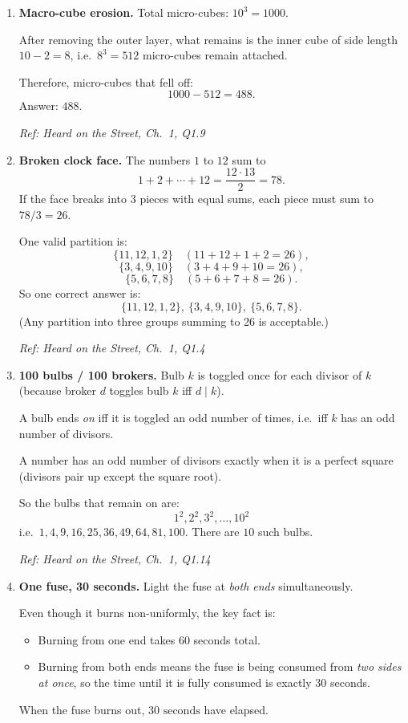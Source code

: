 \documentclass[11pt]{article}
\begin{document}
\begin{enumerate}[label=\textbf{\arabic*.}]

\item \textbf{Macro-cube erosion.}
Total micro-cubes: \(10^3=1000\).

After removing the outer layer, what remains is the inner cube of side length \(10-2=8\), i.e.\ \(8^3=512\) micro-cubes remain attached.

Therefore, micro-cubes that fell off:
\[
1000-512=488.
\]
Answer: \(\boxed{488}\).

\hfill{\small\textit{Ref: Heard on the Street, Ch.\ 1, Q1.9}}

\item \textbf{Broken clock face.}
The numbers \(1\) to \(12\) sum to
\[
1+2+\cdots+12=\frac{12\cdot 13}{2}=78.
\]
If the face breaks into 3 pieces with equal sums, each piece must sum to \(78/3=26\).

One valid partition is:
\[
\{11,12,1,2\}\quad (11+12+1+2=26),
\]
\[
\{3,4,9,10\}\quad (3+4+9+10=26),
\]
\[
\{5,6,7,8\}\quad (5+6+7+8=26).
\]
So one correct answer is:
\[
\boxed{\{11,12,1,2\},\ \{3,4,9,10\},\ \{5,6,7,8\}.}
\]
(Any partition into three groups summing to 26 is acceptable.)

\hfill{\small\textit{Ref: Heard on the Street, Ch.\ 1, Q1.4}}


\item \textbf{100 bulbs / 100 brokers.}
Bulb \(k\) is toggled once for each divisor of \(k\) (because broker \(d\) toggles bulb \(k\) iff \(d\mid k\)).

A bulb ends \emph{on} iff it is toggled an odd number of times, i.e.\ iff \(k\) has an odd number of divisors.

A number has an odd number of divisors exactly when it is a perfect square (divisors pair up except the square root).

So the bulbs that remain on are:
\[
1^2,2^2,3^2,\dots,10^2
\]
i.e.\ \(1,4,9,16,25,36,49,64,81,100\). There are \(\boxed{10}\) such bulbs.

\hfill{\small\textit{Ref: Heard on the Street, Ch.\ 1, Q1.14}}

\item \textbf{One fuse, 30 seconds.}
Light the fuse at \emph{both ends} simultaneously.

Even though it burns non-uniformly, the key fact is:
\begin{itemize}
\item Burning from one end takes 60 seconds total.
\item Burning from both ends means the fuse is being consumed from \emph{two sides at once}, so the time until it is fully consumed is exactly 30 seconds.
\end{itemize}
When the fuse burns out, \(\boxed{30\text{ seconds}}\) have elapsed.


\end{enumerate}
\end{document}
